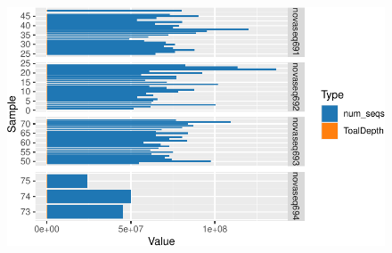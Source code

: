 \documentclass[
  letterpaper,
  DIV=11,
  numbers=noendperiod]{scrartcl}
\begin{document}
\begin{figure}[H]

{\centering \includegraphics{InformeNeiker_files/figure-pdf/unnamed-chunk-4-1.pdf}

}

\end{figure}
\end{document}
